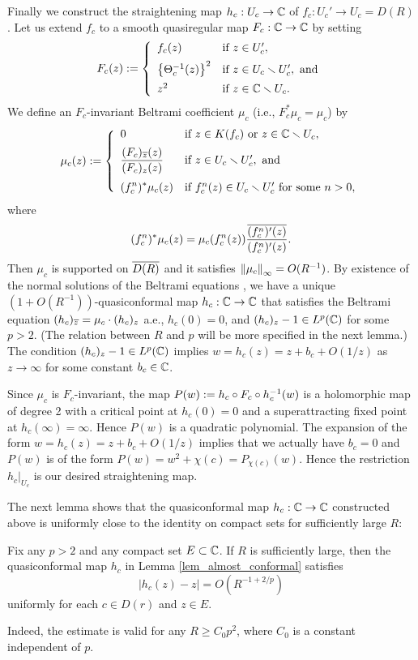 Finally we construct the straightening map $h_c:U_c \to \C$ 
of $f_c:U_c' \to U_c=D(R)$.
Let us extend $f_c$ to a smooth quasiregular map $F_c:\C \to \C$ by setting
$$
F_c(z):=
\left\{\begin{array}{ll}
f_c(z) 
& \text{if}~z \in U_c',\\[.5em] 
\skakko{\Theta_c^{-1}(z)}^2 
& \text{if}~z \in U_c  \sminus  U_c', ~\text{and}\\[.5em]
z^2  
& \text{if}~z \in \C \sminus U_c.
\end{array}\right.
$$
We define an $F_c$-invariant 
 Beltrami coefficient $\mu_c$ (i.e., $F_c^\ast\mu_c=\mu_c$) by
$$
\mu_c(z):=
\left\{\begin{array}{ll}
0 & 
\text{if}~z \in K(f_c)~\text{or}~ z \in \C \sminus U_c,\\[.5em] 
\dfrac{(F_c)_{\Bar{z}}(z)}{(F_c)_z(z)} 
& \text{if}~z \in U_c  \sminus  U_c',~\text{and}\\[1.2em]
\disp (f_c^n)^\ast \mu_c(z)
& \text{if}~f_c^n(z) \in U_c  \sminus  U_c'~\text{for some}~ n >0,
\end{array}\right.
$$
where 
$$
\disp  (f_c^n)^\ast \mu_c(z)
=\mu_c(f_c^n(z))\frac{\Bar{(f_c^n)'(z)}}{(f_c^n)'(z)}.
$$
Then $\mu_c$ is supported on $\Bar{D(R)}$ 
and it satisfies $\norm{\mu_c}_\infty=O(R^{-1})$.
By existence of the normal solutions of the Beltrami equations \cite[Theorem 4.24]{IT Book}, 
we have a unique $(1+ O(R^{-1}))$-quasiconformal map
$h_c:\C \to \C$ that satisfies the Beltrami equation 
$(h_c)_{\Bar{z}}=\mu_c \cdot (h_c)_z$ a.e.,
$h_c(0)=0$, and  
$(h_c)_z-1 \in L^p(\C)$ for some $p >2$.
(The relation between $R$ and $p$ will be more specified in the next lemma.)
The condition $(h_c)_z-1 \in L^p(\C)$ implies $w=h_c(z)=z+b_c+O(1/z)$ 
as $z \to \infty$ for some constant $b_c \in \C$.

Since $\mu_c$ is $F_c$-invariant, 
the map $P(w):=h_c \cc F_c \cc h_c^{-1}(w)$ is a 
holomorphic map of degree 2 with 
a critical point at $h_c(0)=0$ 
and a superattracting fixed point at $h_c(\infty)=\infty.$
Hence $P(w)$ is a quadratic polynomial.
The expansion of the form $w=h_c(z)=z+b_c+O(1/z)$
implies that we actually have $b_c=0$
and $P(w)$ is of the form 
$P(w)=w^2+\chi(c)=P_{\chi(c)}(w)$. Hence the restriction $h_c|_{U_c}$ 
is our desired straightening map.
\QED

The next lemma shows that the quasiconformal 
map $h_c:\C \to \C$ constructed above is uniformly close 
to the identity on compact sets for sufficiently large $R$:

\begin{lem}\label{lem_estimate_of_h}
Fix any $p>2$ and any compact set $E \subset \C$.
If $R$ is sufficiently large, 
then 
the quasiconformal map
$h_c$ in Lemma \ref{lem_almost_conformal} 
satisfies 
$$
|h_c(z)-z|=O(R^{-1+2/p})
$$
uniformly for each $c \in D(r)$ and $z \in E$.
\end{lem}
\noindent
Indeed, the estimate is valid for any $R \ge C_0p^2$, 
where $C_0$ is a constant independent of $p$.


